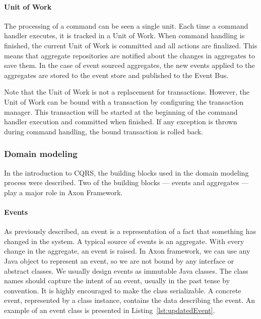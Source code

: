 \documentclass{book}
\begin{document}
\paragraph{Unit of Work}\label{unit-of-work}

The processing of a command can be seen a single unit. Each time a
command handler executes, it is tracked in a Unit of Work. When command
handling is finished, the current Unit of Work is committed and all
actions are finalized. This means that aggregate repositories are
notified about the changes in aggregates to save them. In the case of
event sourced aggregates, the new events applied to the aggregates are
stored to the event store and published to the Event Bus.

Note that the Unit of Work is not a replacement for transactions.
However, the Unit of Work can be bound with a transaction by configuring
the transaction manager. This transaction will be started at the
beginning of the command handler execution and committed when finished.
If any exception is thrown during command handling, the bound
transaction is rolled back.


\subsubsection{Domain modeling}\label{domain-modeling}

In the introduction to CQRS, the building blocks used in the domain
modeling process were described. Two of the building blocks --- events
and aggregates --- play a major role in Axon Framework.

\paragraph{Events}\label{events}

As previously described, an event is a representation of a fact that
something has changed in the system. A typical source of events is an
aggregate. With every change in the aggregate, an event is raised. In
Axon framework, we can use any Java object to represent an event, so we
are not bound by any interface or abstract classes. We usually design
events as immutable Java classes. The class names should capture the
intent of an event, usually in the past tense by convention. It is
highly encouraged to make the class serializable. A concrete event,
represented by a class instance, contains the data describing the event.
An example of an event class is presented in Listing~\ref{lst:updatedEvent}.
\end{document}
